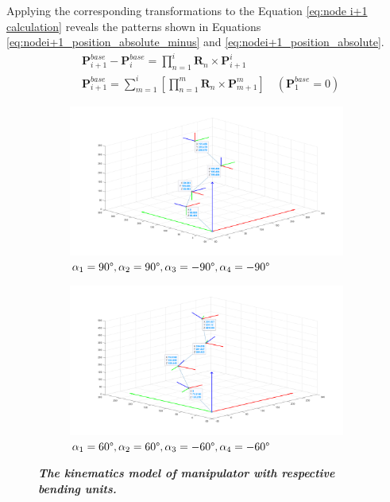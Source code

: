 Applying the corresponding transformations to the Equation \ref{eq:node i+1 calculation} reveals the patterns shown 
in Equations \ref{eq:nodei+1_position_absolute_minus} and \ref{eq:nodei+1_position_absolute}.
\begin{align}
    &\textbf{P}_{i+1}^{base} - \textbf{P}_{i}^{base} = \prod_{n=1}^{i}\textbf{R}_{n}\times \textbf{P}_{i+1}^{i} 
    \label{eq:nodei+1_position_absolute_minus} \\
    &\textbf{P}_{i+1}^{base} = \sum_{m=1}^{i}\left[\prod_{n=1}^{m}\textbf{R}_{n}\times \textbf{P}_{m+1}^{m}\right] \quad(\textbf{P}_{1}^{base} = 0)
    \label{eq:nodei+1_position_absolute}
\end{align}

\begin{figure}[H] %
    \centering %
    \captionsetup{labelsep=colon}
    \begin{subfigure}{0.9\textwidth} %
        \centering
        \includegraphics[width=\linewidth]{Image/MATLAB/manipulator_90_90_-90_-90.png}
        \caption{$\alpha_1=90\degree,\alpha_2=90\degree,\alpha_3=-90\degree,\alpha_4=-90\degree$}
    \end{subfigure}
    \hfill
    \begin{subfigure}{0.9\textwidth} %
        \centering
        \includegraphics[width=\linewidth]{Image/MATLAB/manipulator_60_60_-60_-60.png}
        \caption{$\alpha_1=60\degree,\alpha_2=60 \degree,\alpha_3=-60\degree,\alpha_4=-60\degree$}
    \end{subfigure}
    \caption[The kinematics model of manipulator with respective bending units]
    {\centering \textit{\textbf{The kinematics model of manipulator with respective bending units.}}}
    \label{fig:different}
\end{figure}

